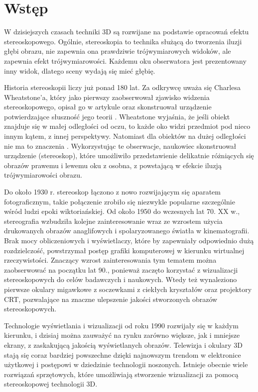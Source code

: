 
\graphicspath{{images/}}



\thesisstyle
\tableofcontents

\newpage 
\section[Wstęp]{Wstęp}
W dzisiejszych czasach techniki 3D są rozwijane na podstawie opracowań efektu stereoskopowego. Ogólnie, stereoskopia to technika służącą do tworzenia iluzji głębi obrazu, nie zapewnia ona prawdziwie trójwymiarowych widoków, ale zapewnia efekt trójwymiarowości. Każdemu oku obserwatora jest prezentowany inny widok, dlatego sceny wydają się mieć głębię.

Historia stereoskopii liczy już ponad 180 lat. Za odkrywcę uważa się Charlesa Wheatstone'a, który jako pierwszy zaobserwował zjawisko widzenia stereoskopowego, opisał go w artykule oraz skonstruował urządzenie potwierdzające słuszność jego teorii \cite{stereoscopehistory}. Wheatstone wyjaśnia, że jeśli obiekt znajduje się w małej odległości od oczu, to każde oko widzi przedmiot pod nieco innym kątem, z innej perspektywy. Natomiast dla obiektów na dużej odległości nie ma to znaczenia \cite{wheatstone}. Wykorzystując te obserwacje, naukowiec skonstruował urządzenie (stereoskop), które umożliwiło przedstawienie delikatnie różniących się obrazów prawemu i lewemu oku z osobna, z powstającą w efekcie iluzją trójwymiarowości obrazu.

Do około 1930 r. stereoskop łączono z nowo rozwijającym się aparatem fotograficznym, takie połączenie zrobiło się niezwykle popularne szczególnie wśród ludzi epoki wiktoriańskiej. Od około 1950 do wczesnych lat 70. XX w., stereografia wzbudziła kolejne zainteresowanie wraz ze wzrostem użycia drukowanych obrazów anaglifowych i spolaryzowanego światła w kinematografii. Brak mocy obliczeniowych i wyświetlaczy, które by zapewniały odpowiednio dużą rozdzielczość, powstrzymał postęp grafiki komputerowej w kierunku wirtualnej rzeczywistości. Znaczący wzrost zainteresowania tym tematem można zaobserwować na początku lat 90., ponieważ zaczęto korzystać z wizualizacji stereoskopowych do celów badawczych i naukowych. Wtedy też wynaleziono pierwsze okulary migawkowe z soczewkami z ciekłych kryształów oraz projektory CRT, pozwalające na znaczne ulepszenie jakości stworzonych obrazów stereoskopowych.

Technologie wyświetlania i wizualizacji od roku 1990 rozwijały się w każdym kierunku, i dzisiaj można zauważyć na rynku zarówno większe, jak i mniejsze ekrany, z zaskakującą jakością wyświetlanych obrazów. Telewizja i okulary 3D stają się coraz bardziej powszechne dzięki najnowszym trendom w elektronice użytkowej i postępowi w dziedzinie technologii noszonych. Istnieje obecnie wiele rozwiązań sprzętowych, które umożliwiają stworzenie wizualizacji za pomocą stereoskopowej technologii 3D. 

